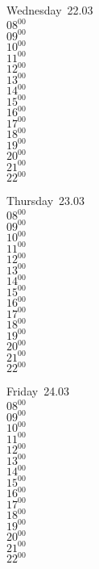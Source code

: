 \documentclass[11pt,a4paper]{book}\usepackage[]{graphicx}\usepackage[]{color}
\begin{document}
\begin{weekdaybox}
  Wednesday~22.03\\
  { 
  \vfill
  $08^{00}$\\
$09^{00}$\\
$10^{00}$\\
$11^{00}$\\
$12^{00}$\\
$13^{00}$\\
$14^{00}$\\
$15^{00}$\\
$16^{00}$\\
$17^{00}$\\
$18^{00}$\\
$19^{00}$\\
$20^{00}$\\
$21^{00}$\\
$22^{00}$\\
  }
\end{weekdaybox}
\clearpage
\begin{headerbox}
\end{headerbox}
\begin{weekdaybox}
  Thursday~23.03\\
  { 
  \vfill
  $08^{00}$\\
$09^{00}$\\
$10^{00}$\\
$11^{00}$\\
$12^{00}$\\
$13^{00}$\\
$14^{00}$\\
$15^{00}$\\
$16^{00}$\\
$17^{00}$\\
$18^{00}$\\
$19^{00}$\\
$20^{00}$\\
$21^{00}$\\
$22^{00}$\\
  }
\end{weekdaybox} 
\begin{weekdaybox}
  Friday~24.03\\
  { 
  \vfill
  $08^{00}$\\
$09^{00}$\\
$10^{00}$\\
$11^{00}$\\
$12^{00}$\\
$13^{00}$\\
$14^{00}$\\
$15^{00}$\\
$16^{00}$\\
$17^{00}$\\
$18^{00}$\\
$19^{00}$\\
$20^{00}$\\
$21^{00}$\\
$22^{00}$\\
  }
\end{weekdaybox}
\end{document}
